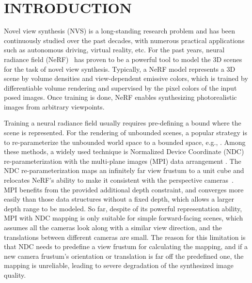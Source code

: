 \documentclass[letterpaper, 10 pt, conference]{ieeeconf}  %
\begin{document}
\section{INTRODUCTION}

Novel view synthesis (NVS) is a long-standing research problem and has been continuously studied over the past decades, with numerous practical applications such as autonomous driving, virtual reality, etc. 
For the past years, neural radiance field (NeRF)~\cite{mildenhall2020nerf,barron2021mip,tancik2023nerfstudio} has proven to be a powerful tool to model the 3D scenes for the task of novel view synthesis.
Typically, a NeRF model represents a 3D scene by volume densities and view-dependent emissive colors, which is trained by differentiable volume rendering and supervised by the pixel colors of the input posed images. Once training is done, NeRF enables synthesizing photorealistic images from arbitrary viewpoints.


Training a neural radiance field usually requires pre-defining a bound where the scene is represented.
For the rendering of unbounded scenes, a popular strategy is to re-parameterize the unbounded world space to a bounded space, e.g., \cite{mildenhall2020nerf,zhang2020nerf++,barron2022mip}. Among these methods, a widely used technique is Normalized Device Coordinate (NDC) re-parameterization with the multi-plane images (MPI) data arrangement
\cite{wizadwongsa2021nex,sun2022improved}.
The NDC re-parameterization maps an infinitely far view frustum to a unit cube and relocates NeRF's ability to make it consistent with the perspective cameras~\cite{barron2022mip,mildenhall2020nerf}.
MPI benefits from the provided additional depth constraint, and converges more easily than those data structures without a fixed depth, which allows a larger depth range to be modeled.
So far, despite of its powerful representation ability, MPI with NDC mapping is only suitable for simple forward-facing scenes, which assumes all the cameras look along with a similar view direction, and the translations between different cameras are small.
The reason for this limitation is that NDC needs to predefine a view frustum for calculating the mapping, and if a new camera frustum's orientation or translation is far off the predefined one, the mapping is unreliable, leading to severe degradation of the synthesized image quality.
\end{document}
